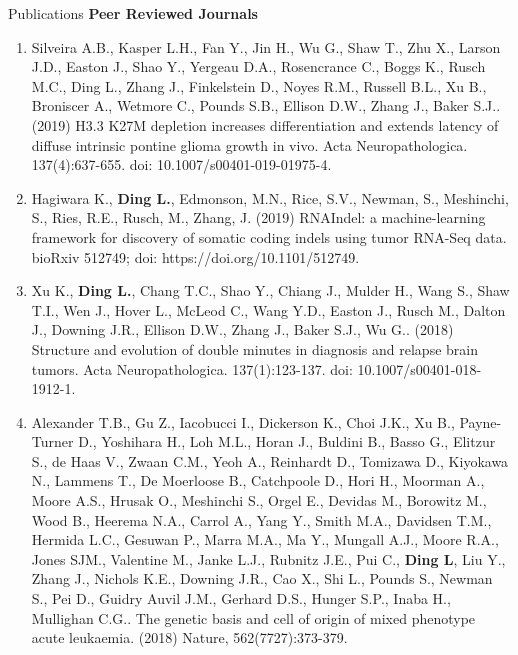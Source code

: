 \documentclass{resume} %
\begin{document}

\begin{rSection}{Publications}
\textbf{Peer Reviewed Journals}
\begin{enumerate}
\item Silveira A.B., Kasper L.H., Fan Y., Jin H., Wu G., Shaw T., Zhu X., Larson J.D., Easton J., Shao Y., Yergeau D.A., Rosencrance C., Boggs K., Rusch M.C., Ding L., Zhang J., Finkelstein D., Noyes R.M., Russell B.L., Xu B., Broniscer A., Wetmore C., Pounds S.B., Ellison D.W., Zhang J., Baker S.J.. (2019) H3.3 K27M depletion increases differentiation and extends latency of diffuse intrinsic pontine glioma growth in vivo. Acta Neuropathologica. 137(4):637-655. doi: 10.1007/s00401-019-01975-4.

\item Hagiwara K., \textbf{Ding L.}, Edmonson, M.N., Rice, S.V., Newman, S., Meshinchi, S., Ries, R.E., Rusch, M., Zhang, J. (2019) RNAIndel: a machine-learning framework for discovery of somatic coding indels using tumor RNA-Seq data. bioRxiv 512749; doi: https://doi.org/10.1101/512749.

\item Xu K., \textbf{Ding L.}, Chang T.C., Shao Y., Chiang J., Mulder H., Wang S., Shaw T.I., Wen J., Hover L., McLeod C., Wang Y.D., Easton J., Rusch M., Dalton J., Downing J.R., Ellison D.W., Zhang J., Baker S.J., Wu G.. (2018) Structure and evolution of double minutes in diagnosis and relapse brain tumors. Acta Neuropathologica. 137(1):123-137. doi: 10.1007/s00401-018-1912-1.

\item Alexander T.B., Gu Z., Iacobucci I., Dickerson K., Choi J.K., Xu B., Payne-Turner D., Yoshihara H., Loh M.L., Horan J., Buldini B., Basso G., Elitzur S., de Haas V., Zwaan C.M., Yeoh A., Reinhardt D., Tomizawa D., Kiyokawa N., Lammens T., De Moerloose B., Catchpoole D., Hori H., Moorman A., Moore A.S., Hrusak O., Meshinchi S., Orgel E., Devidas M., Borowitz M., Wood B., Heerema N.A., Carrol A., Yang Y., Smith M.A., Davidsen T.M., Hermida L.C., Gesuwan P., Marra M.A., Ma Y., Mungall A.J., Moore R.A., Jones SJM., Valentine M., Janke L.J., Rubnitz J.E., Pui C., \textbf{Ding L}, Liu Y., Zhang J., Nichols K.E., Downing J.R., Cao X., Shi L., Pounds S., Newman S., Pei D., Guidry Auvil J.M., Gerhard D.S., Hunger S.P., Inaba H., Mullighan C.G.. The genetic basis and cell of origin of mixed phenotype acute leukaemia. (2018) Nature, 562(7727):373-379.


\end{enumerate}
\end{rSection}
\end{document}
